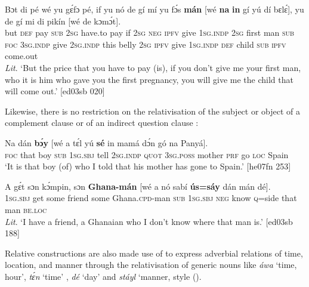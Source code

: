 \ea%
    \label{ex:key:1427}
    \gll Bɔt  di  pé  wé  yu  gɛ́fɔ    pé,  if  yu  nó  de    gí  mí    yu
fɔ́s    \textbf{mán}  [wé  \textbf{na}  \textbf{in}    gí    yú    dí  bɛlɛ́],  yu  de  gí
mi    di  pikín  [wé  de  kɔmɔ́t].\\
but  \textsc{def}  pay  \textsc{sub}  \textsc{2sg}  have.to  pay  if  \textsc{2sg}  \textsc{neg}  \textsc{ipfv}    give  \textsc{1sg.indp}  \textsc{2sg}
first    man     \textsc{sub}  \textsc{foc}  \textsc{3sg.indp}  give    \textsc{2sg.indp}  this  belly  \textsc{2sg}  \textsc{ipfv}  give
\textsc{1sg.indp}  \textsc{def}  child   \textsc{sub}  \textsc{ipfv}  come.out\\
\glt 
\textit{Lit}. ‘But the price that you have to pay (is), if you don’t give me your first man,
who it is him who gave you the first pregnancy, you will give me the child that
will come out.’ [ed03sb 020]
\z

Likewise, there is no restriction on the relativisation of the subject or object of a complement clause  or of an indirect question clause :


\ea%
    \label{ex:key:1428}
    \gll Na  dán  \textbf{bɔ́y}  [wé  a    tɛ́l  yú    \textbf{sé}    in    mamá  dɔ́n
gó  na  Panyá].\\
\textsc{foc}  that  boy   \textsc{sub}  \textsc{1sg.sbj}  tell  \textsc{2sg.indp}  \textsc{quot}    \textsc{3sg.poss}  mother  \textsc{prf}
go  \textsc{loc}  Spain\\

\glt ‘It is that boy (of) who I told that his mother has gone to Spain.’ [he07fn 253]
\z


\ea%
    \label{ex:key:1429}
    \gll A    gɛ́t  sɔn    kɔ́mpin,  sɔn    \textbf{Ghana-mán}    [wé  a    nó  sabí
\textbf{ús=sáy}  dán  mán    dé].\\
\textsc{1sg.sbj}  get  some  friend  some  Ghana\textsc{.cpd}{}-man   \textsc{sub}  \textsc{1sg.sbj}  \textsc{neg}  know
\textsc{q}=side  that  man    \textsc{be.loc}\\

\glt \textit{Lit}. ‘I have a friend, a Ghanaian who I don’t know where that man is.’ [ed03sb 188]
\z

Relative constructions are also made use of to express adverbial relations of time, location, and manner through the relativisation of generic nouns{\fff} like \textit{áwa} ‘time, hour’, \textit{tɛ́n} ‘time’ , \textit{dé} ‘day’  and \textit{stáyl} ‘manner, style ().

